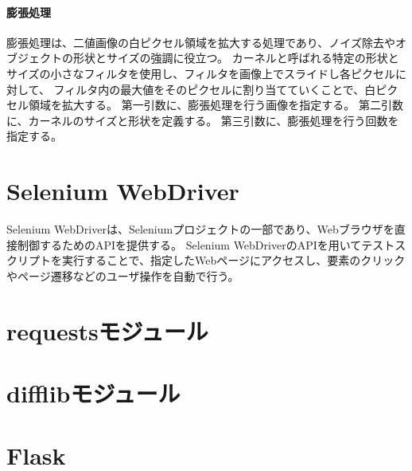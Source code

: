 \paragraph{膨張処理}\label{sec:dilation}
膨張処理は、二値画像の白ピクセル領域を拡大する処理であり、ノイズ除去やオブジェクトの形状とサイズの強調に役立つ\cite{膨張処理}。
カーネルと呼ばれる特定の形状とサイズの小さなフィルタを使用し、フィルタを画像上でスライドし各ピクセルに対して、
フィルタ内の最大値をそのピクセルに割り当てていくことで、白ピクセル領域を拡大する。
第一引数に、膨張処理を行う画像を指定する。
第二引数に、カーネルのサイズと形状を定義する。
第三引数に、膨張処理を行う回数を指定する。


\section{Selenium WebDriver}\label{sec:Selenium_WebDriver}
Selenium WebDriver\cite{Selenium WebDriver}は、Seleniumプロジェクト\cite{Selenium}の一部であり、Webブラウザを直接制御するためのAPIを提供する。
Selenium WebDriverのAPIを用いてテストスクリプトを実行することで、指定したWebページにアクセスし、要素のクリックやページ遷移などのユーザ操作を自動で行う。

\section{requestsモジュール}\label{sec:requests}

\section{difflibモジュール}\label{sec:difflib}

\section{Flask}\label{sec:Flask}